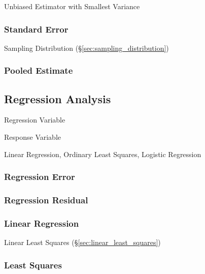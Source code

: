 Unbiased Estimator with Smallest Variance



\subsubsection{Standard Error}\label{sec:standard_error}

Sampling Distribution (\S\ref{sec:sampling_distribution})



\subsubsection{Pooled Estimate}\label{sec:pooled_estimate}




\subsection{Regression Analysis}\label{sec:regression_analysis}

Regression Variable

Response Variable


Linear Regression, Ordinary Least Squares, Logistic Regression



\subsubsection{Regression Error}\label{sec:regression_error}

\subsubsection{Regression Residual}\label{sec:regression_residual}

\subsubsection{Linear Regression}\label{sec:linear_regression}

Linear Least Squares (\S\ref{sec:linear_least_squares})



\subsubsection{Least Squares}\label{sec:least_squares}

